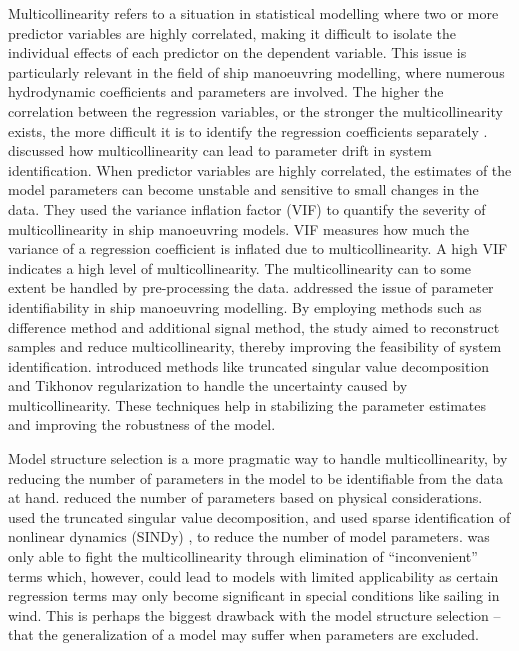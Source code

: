 Multicollinearity refers to a situation in statistical modelling where two or more predictor variables are highly correlated, making it difficult to isolate the individual effects of each predictor on the dependent variable. This issue is particularly relevant in the field of ship manoeuvring modelling, where numerous hydrodynamic coefficients and parameters are involved.
The higher the correlation between the regression variables, or the stronger the multicollinearity exists, the more difficult it is to identify the regression coefficients separately \cite{yoonIdentificationHydrodynamicCoefficients2003}.
\textcite{wangQuantifyingMulticollinearityShip2018} discussed how multicollinearity can lead to parameter drift in system identification. When predictor variables are highly correlated, the estimates of the model parameters can become unstable and sensitive to small changes in the data. They used the variance inflation factor (VIF) to quantify the severity of multicollinearity in ship manoeuvring models. VIF measures how much the variance of a regression coefficient is inflated due to multicollinearity. A high VIF indicates a high level of multicollinearity.
The multicollinearity can to some extent be handled by pre-processing the data.
\textcite{luoParameterIdentificationShip2016} addressed the issue of parameter identifiability in ship manoeuvring modelling. By employing methods such as difference method and additional signal method, the study aimed to reconstruct samples and reduce multicollinearity, thereby improving the feasibility of system identification.
\textcite{xuUncertaintyAnalysisHydrodynamic2019} introduced methods like truncated singular value decomposition and Tikhonov regularization to handle the uncertainty caused by multicollinearity. These techniques help in stabilizing the parameter estimates and improving the robustness of the model.

Model structure selection is a more pragmatic way to handle multicollinearity, by reducing the number of parameters in the model to be identifiable from the data at hand.  \textcite{luoParameterIdentificationShip2016} reduced the number of parameters based on physical considerations. \textcite{costaRobustParameterEstimation2021} used the truncated singular value decomposition, and \textcite{liuPhysicsinformedIdentificationMarine2024} used sparse identification of nonlinear dynamics (SINDy) \cite{bruntonDiscoveringGoverningEquations2016}, to reduce the number of model parameters. 
\textcite{abkowitzMEASUREMENTHYDRODYNAMICCHARACTERISTICS1980} was only able to fight the multicollinearity through elimination of “inconvenient” terms which, however, could lead to models with limited applicability as certain regression terms may only become significant in special conditions like sailing in wind. This is perhaps the biggest drawback with the model structure selection – that the generalization of a model may suffer when parameters are excluded.

